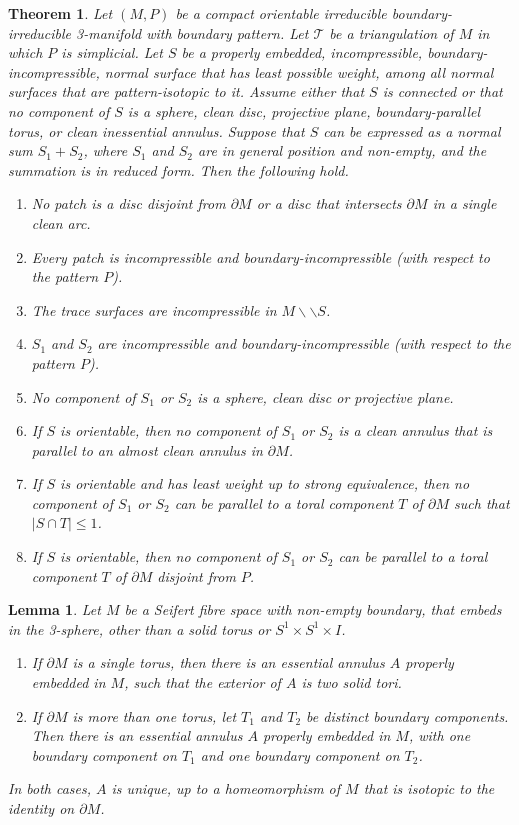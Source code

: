 \documentclass[10pt,a4paper]{amsart}
\newtheorem{theorem}{Theorem}
\newtheorem{lemma}{Lemma}
\newcommand{\cut}{\backslash\backslash}
\begin{document}
\begin{theorem}
\label{Thm:SummandsEssentialEtc}
Let $(M,P)$ be a compact orientable irreducible boundary-irreducible 3-manifold with boundary pattern.
Let $\mathcal{T}$ be a triangulation of $M$ in which $P$ is simplicial. 
Let $S$ be a properly embedded, incompressible, boundary-incompressible, normal surface that has least possible weight,
among all normal surfaces that are pattern-isotopic to it. Assume either that $S$ is connected or that no component of $S$ is a sphere, clean disc, projective plane, boundary-parallel torus, or clean inessential annulus.
Suppose that $S$ can be expressed as a normal sum $S_1 + S_2$,
where $S_1$ and $S_2$ are in general position and non-empty, and the summation is in reduced form. Then the following hold.
\begin{enumerate}
\item No patch is a disc disjoint from $\partial M$ or a disc that intersects $\partial M$ in a single clean arc.
\item Every patch is incompressible and boundary-incompressible (with respect to the pattern $P$).
\item The trace surfaces are incompressible in $M \cut S$.
\item $S_1$ and $S_2$ are incompressible and boundary-incompressible (with respect to the pattern $P$).
\item No component of $S_1$ or $S_2$ is a sphere, clean disc or projective plane. 
\item If $S$ is orientable, then no component of $S_1$ or $S_2$ is a clean annulus that is parallel to an almost clean annulus in $\partial M$.
\item If $S$ is orientable and has least weight up to strong equivalence, then no component of $S_1$ or $S_2$ can be parallel to a toral component $T$ of $\partial M$
such that $|S \cap T| \leq 1$.
\item If $S$ is orientable, then no component of $S_1$ or $S_2$ can be parallel to a toral component $T$ of $\partial M$
disjoint from $P$.
\end{enumerate}
\end{theorem}

\begin{lemma}
\label{Lem:AnnuliInSFS}
Let $M$ be a Seifert fibre space with non-empty boundary, that embeds in the 3-sphere,
other than a solid torus or $S^1 \times S^1 \times I$.
\begin{enumerate}
\item If $\partial M$ is a single torus, then there is an essential annulus $A$ properly
embedded in $M$, such that the exterior of $A$ is two solid tori.
\item If $\partial M$ is more than one torus, let $T_1$ and $T_2$ be distinct
boundary components. Then there is an essential annulus $A$ properly embedded
in $M$, with one boundary component on $T_1$ and one boundary component on $T_2$.
\end{enumerate}
In both cases, $A$ is unique, up to a homeomorphism of $M$ that is
isotopic to the identity on $\partial M$.
\end{lemma}
\end{document}
